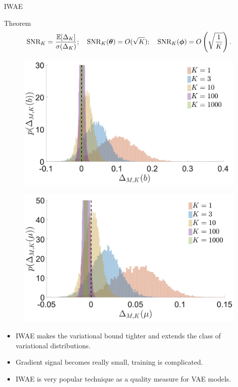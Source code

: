 \begin{frame}{IWAE}
	\begin{block}{Theorem}
		\vspace{-0.5cm}
		\[
			\text{SNR}_K = \frac{\mathbb{E} [\Delta_K]}{\sigma(\Delta_K)}; \quad
			\text{SNR}_K(\boldsymbol{\theta}) = O(\sqrt{K}); \quad 
			\text{SNR}_K(\boldsymbol{\phi}) = O\left(\sqrt{\frac{1}{K}}\right).
		\]
		\vspace{-0.8cm}
	\end{block}
		\begin{minipage}[t]{0.5\columnwidth}
			\begin{figure}[h]
				\centering
				\includegraphics[width=1.\linewidth]{figs/IWAE_SNR_1.png}
			\end{figure}
		\end{minipage}%
		\begin{minipage}[t]{0.5\columnwidth}
			\begin{figure}[h]
				\centering
				\includegraphics[width=1.\linewidth]{figs/IWAE_SNR_2.png}
			\end{figure}
		\end{minipage}
	\begin{itemize}
		\item IWAE makes the variational bound tighter and extends the class of variational distributions.
		\item Gradient signal becomes really small, training is complicated.
		\item IWAE is very popular technique as a quality measure for VAE models.
	\end{itemize}
\end{frame}
